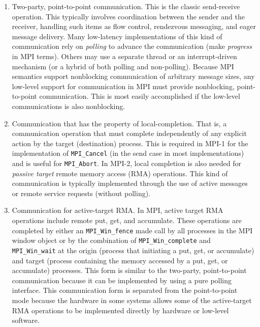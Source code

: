 \documentclass{article}
\def\code#1{\texttt{#1}}
\begin{document}
\begin{enumerate}
\item Two-party, point-to-point communication.  This is the classic
send-receive operation.  This typically involves coordination between
the sender and the receiver, handling such items as flow control,
rendezvous messaging, and eager message delivery.  Many low-latency
implementations of this kind of communication rely on \emph{polling}
to advance the communication (make \emph{progress} in MPI terms).
Others may use a separate thread or an interrupt-driven mechanism (or
a hybrid of both polling and non-polling). 
Because MPI semantics support nonblocking communication of arbitrary
message sizes, any low-level support for communication in MPI must
provide nonblocking, point-to-point communication.  This is most
easily accomplished if the low-level communications is also
nonblocking.

\item Communication that has the property of local-completion. That
is, a communication operation that must complete independently of any
explicit action by the target (destination) process.  This is required
in MPI-1 for the implementation of \code{MPI_Cancel} (in the send
case in most implementations) and is useful for \code{MPI_Abort}.
In MPI-2, local completion is also needed for \emph{passive target}
remote memory access (RMA) operations.  This kind of communication is
typically implemented through the use of active messages or remote
service requests (without polling).

\item Communication for active-target RMA.  In MPI, active target RMA
operations include remote put, get, and accumulate.  These operations
are completed by either an \code{MPI_Win_fence} made call by all processes
in the MPI window object or by the combination of
\code{MPI_Win_complete} and \code{MPI_Win_wait} at the origin (process
that initiating a put, get, or accumulate) and target (process
containing the memory accessed by a put, get, or accumulate)
processes.  This form is similar to the two-party, point-to-point
communication because it can be implemented by using a pure polling
interface. This communication form is separated from the point-to-point
mode because the hardware in some systems allows some of the
active-target RMA operations to be implemented directly by hardware or
low-level software.


\end{enumerate}
\end{document}
